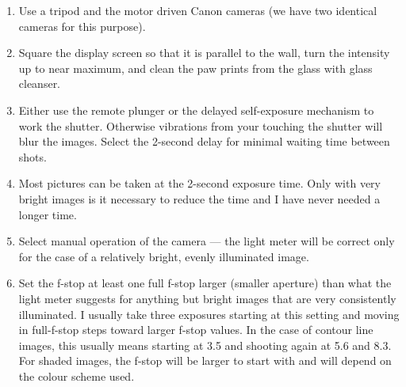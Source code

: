 \begin{enumerate}
  \item Use a tripod and the motor driven Canon cameras (we have two
        identical cameras for this purpose).
  \item Square the display screen so that it is parallel to the wall, turn
        the intensity up to near maximum, and
        clean the paw prints from the glass with glass cleanser.
  \item Either use the remote plunger or the delayed self-exposure
        mechanism to work the shutter.  Otherwise vibrations from your
        touching the shutter will blur the images.  Select the 2-second
        delay for minimal waiting time between shots.
  \item Most pictures can be taken at the 2-second exposure time.  Only
        with very bright images is it necessary to reduce the time and I
        have never needed a longer time.
  \item Select manual operation of the camera --- the light meter will be
        correct only for the case of a relatively bright, evenly illuminated
        image. 
  \item Set the f-stop at least one full f-stop larger (smaller aperture)
        than what the light meter suggests for anything
        but bright images that are very consistently illuminated.  I
        usually take three exposures starting at this setting and moving in
        full-f-stop steps toward larger f-stop values.  In the case of
        contour line images, this usually means starting at 3.5 and
        shooting again at
        5.6 and 8.3.  For shaded images, the f-stop will be larger to
        start with and will depend on the colour scheme used.
\end{enumerate}


